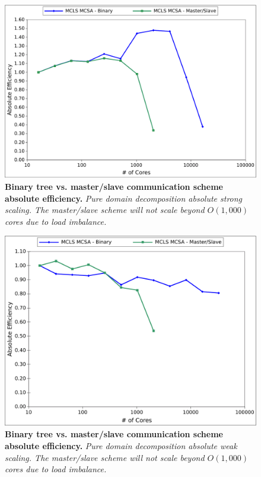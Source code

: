 \begin{figure}[t!]
  \begin{center}
    \includegraphics[width=6in]{chapters/parallel_mc/titan_strong_bvsm.pdf}
  \end{center}
  \caption{\textbf{Binary tree vs. master/slave communication scheme
      absolute efficiency.} \textit{Pure domain decomposition absolute
      strong scaling. The master/slave scheme will not scale beyond
      $O(1,000)$ cores due to load imbalance.}}
  \label{fig:titan_strong_bvsm}
\end{figure}

\begin{figure}[t!]
  \begin{center}
    \includegraphics[width=6in]{chapters/parallel_mc/titan_weak_bvsm.pdf}
  \end{center}
  \caption{\textbf{Binary tree vs. master/slave communication scheme
      absolute efficiency.}  \textit{Pure domain decomposition
      absolute weak scaling. The master/slave scheme will not scale
      beyond $O(1,000)$ cores due to load imbalance.}}
  \label{fig:titan_weak_bvsm}
\end{figure}

